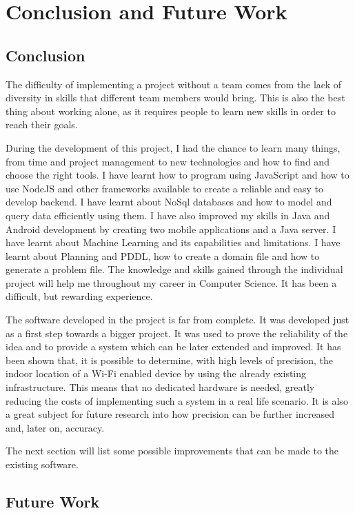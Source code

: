 \chapter{Conclusion and Future Work}

\section{Conclusion}
The difficulty of implementing a project without a team comes from the lack of diversity in skills that different team members would bring. This is also the best thing about working alone, as it requires people to learn new skills in order to reach their goals. 

During the development of this project, I had the chance to learn many things, from time and project management to new technologies and how to find and choose the right tools. I have learnt how to program using JavaScript and how to use NodeJS and other frameworks available to create a reliable and easy to develop backend. I have learnt about NoSql databases and how to model and query data efficiently using them. 
I have also improved my skills in Java and Android development by creating two mobile applications and a Java server. I have learnt about Machine Learning and its capabilities and limitations. I have learnt about Planning and PDDL, how to create a domain file and how to generate a problem file. The knowledge and skills gained through the individual project will help me throughout my career in Computer Science. It has been a difficult, but rewarding experience. 

The software developed in the project is far from complete. It was developed just as a first step towards a bigger project. It was used to prove the reliability of the idea and to provide a system which can be later extended and improved. It has been shown that, it is possible to determine, with high levels of precision, the indoor location of a Wi-Fi enabled device by using the already existing infrastructure. This means that no dedicated hardware is needed, greatly reducing the costs of implementing such a system in a real life scenario. It is also a great subject for future research into how precision can be further increased and, later on, accuracy. 
 
The next section will list some possible improvements that can be made to the existing software.

\section{Future Work}
